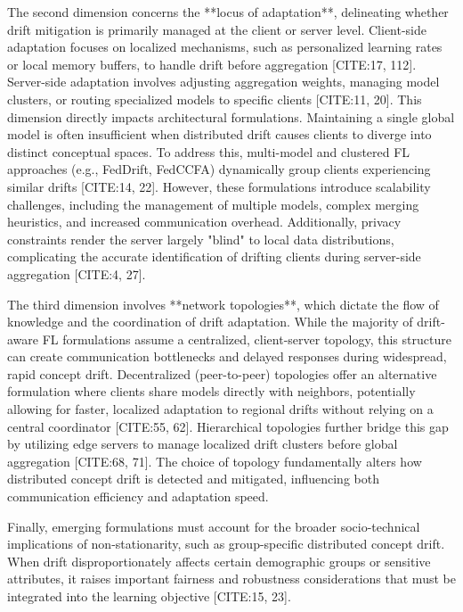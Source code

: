 \documentclass[journal]{IEEEtran}
\begin{document}
The second dimension concerns the **locus of adaptation**, delineating whether drift mitigation is primarily managed at the client or server level. Client-side adaptation focuses on localized mechanisms, such as personalized learning rates or local memory buffers, to handle drift before aggregation [CITE:17, 112]. Server-side adaptation involves adjusting aggregation weights, managing model clusters, or routing specialized models to specific clients [CITE:11, 20]. This dimension directly impacts architectural formulations. Maintaining a single global model is often insufficient when distributed drift causes clients to diverge into distinct conceptual spaces. To address this, multi-model and clustered FL approaches (e.g., FedDrift, FedCCFA) dynamically group clients experiencing similar drifts [CITE:14, 22]. However, these formulations introduce scalability challenges, including the management of multiple models, complex merging heuristics, and increased communication overhead. Additionally, privacy constraints render the server largely "blind" to local data distributions, complicating the accurate identification of drifting clients during server-side aggregation [CITE:4, 27].

The third dimension involves **network topologies**, which dictate the flow of knowledge and the coordination of drift adaptation. While the majority of drift-aware FL formulations assume a centralized, client-server topology, this structure can create communication bottlenecks and delayed responses during widespread, rapid concept drift. Decentralized (peer-to-peer) topologies offer an alternative formulation where clients share models directly with neighbors, potentially allowing for faster, localized adaptation to regional drifts without relying on a central coordinator [CITE:55, 62]. Hierarchical topologies further bridge this gap by utilizing edge servers to manage localized drift clusters before global aggregation [CITE:68, 71]. The choice of topology fundamentally alters how distributed concept drift is detected and mitigated, influencing both communication efficiency and adaptation speed.

Finally, emerging formulations must account for the broader socio-technical implications of non-stationarity, such as group-specific distributed concept drift. When drift disproportionately affects certain demographic groups or sensitive attributes, it raises important fairness and robustness considerations that must be integrated into the learning objective [CITE:15, 23]. 
\end{document}
